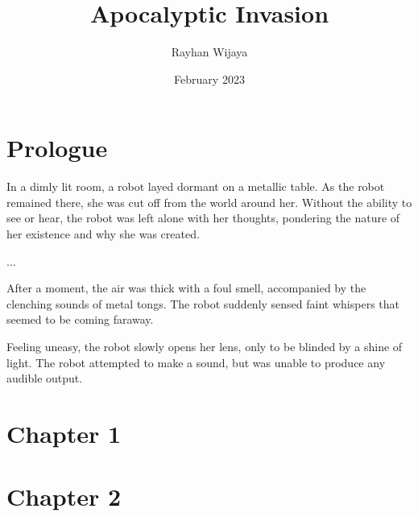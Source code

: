 \documentclass[12pt]{book}
\title{Apocalyptic Invasion}
\author{Rayhan Wijaya}
\date{February 2023}
\begin{document}
\maketitle

\section*{Prologue}

In a dimly lit room, a robot layed dormant on a metallic table. As the robot
remained there, she was cut off from the world around her. Without the ability
to see or hear, the robot was left alone with her thoughts, pondering the
nature of her existence and why she was created.

...

After a moment, the air was thick with a foul smell, accompanied by the
clenching sounds of metal tongs. The robot suddenly sensed faint whispers that
seemed to be coming faraway.

Feeling uneasy, the robot slowly opens her lens, only to be blinded by a shine
of light. The robot attempted to make a sound, but was unable to produce any
audible output.

\section*{Chapter 1}

\section*{Chapter 2}
\end{document}
